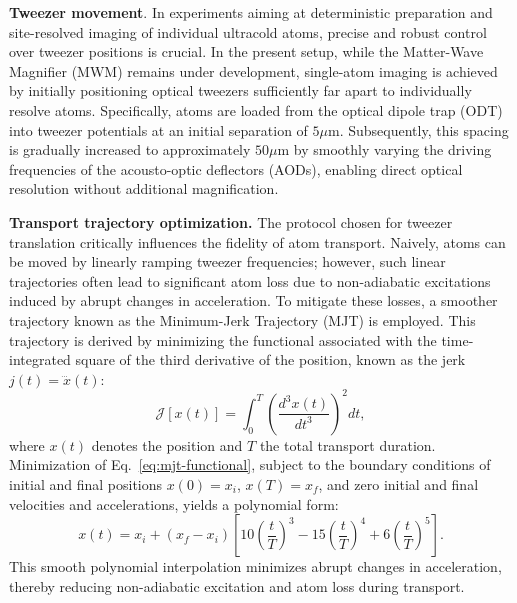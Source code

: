 




\textbf{Tweezer movement}.
In experiments aiming at deterministic preparation and site-resolved imaging of individual ultracold atoms, precise and robust control over tweezer positions is crucial. In the present setup, while the Matter-Wave Magnifier (MWM) remains under development, single-atom imaging is achieved by initially positioning optical tweezers sufficiently far apart to individually resolve atoms. Specifically, atoms are loaded from the optical dipole trap (ODT) into tweezer potentials at an initial separation of $5\mu$m. Subsequently, this spacing is gradually increased to approximately $50\mu$m by smoothly varying the driving frequencies of the acousto-optic deflectors (AODs), enabling direct optical resolution without additional magnification.

\textbf{Transport trajectory optimization.}
The protocol chosen for tweezer translation critically influences the fidelity of atom transport. Naively, atoms can be moved by linearly ramping tweezer frequencies; however, such linear trajectories often lead to significant atom loss due to non-adiabatic excitations induced by abrupt changes in acceleration. To mitigate these losses, a smoother trajectory known as the Minimum-Jerk Trajectory (MJT) is employed. This trajectory is derived by minimizing the functional associated with the time-integrated square of the third derivative of the position, known as the jerk $j(t) = \dddot{x}(t)$:
\begin{equation}
\mathcal{J}[x(t)] = \int_{0}^{T} \left(\frac{d^3 x(t)}{dt^3}\right)^2 dt,
\label{eq:mjt-functional}
\end{equation}
where $x(t)$ denotes the position and $T$ the total transport duration. Minimization of Eq.~\eqref{eq:mjt-functional}, subject to the boundary conditions of initial and final positions $x(0) = x_i$, $x(T) = x_f$, and zero initial and final velocities and accelerations, yields a polynomial form:
\begin{equation}
x(t) = x_i + (x_f - x_i)\left[10\left(\frac{t}{T}\right)^3 - 15\left(\frac{t}{T}\right)^4 + 6\left(\frac{t}{T}\right)^5\right].
\label{eq:mjt-solution}
\end{equation}
This smooth polynomial interpolation minimizes abrupt changes in acceleration, thereby reducing non-adiabatic excitation and atom loss during transport.

